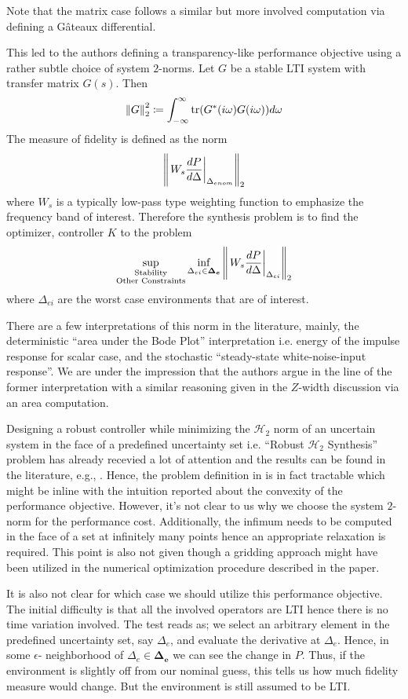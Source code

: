 Note that the matrix case follows a similar but more involved computation via defining a G\^{a}teaux differential.


This led to the authors defining a transparency-like performance objective using a rather subtle choice of system 
$2$-norms. Let $G$ be a stable LTI system with transfer matrix $G(s)$. Then 
\[
\displaystyle \left\| G \right\|_2^2 \coloneqq \int_{-\infty}^\infty{\operatorname{tr}(G^*(i\omega)G(i\omega))}d\omega
\] 
The measure of fidelity is defined as the norm
\[
\displaystyle \left\| \left.W_s\frac{dP}{d\Delta}\right|_{\Delta_{enom}} \right\|_2
\]
where $W_s$ is a typically low-pass type weighting function to emphasize the frequency band of interest. Therefore
the synthesis problem is to find the optimizer, controller $K$ to the problem
\[
\sup_{\substack{\text{Stability}\\\text{Other Constraints}}}\inf_{\Delta_{ei}\in\bm{\Delta_e}}
\displaystyle \left\| \left.W_s\frac{dP}{d\Delta}\right|_{\Delta_{ei}} \right\|_2
\]
where $\Delta_{ei}$ are the worst case environments that are of interest.


There are a few interpretations of this norm in the literature, mainly, the deterministic \enquote{area under the Bode
Plot} interpretation i.e. energy of the impulse response for scalar case, and the stochastic \enquote{steady-state 
white-noise-input response}. We are under the impression that the authors argue in the line of the former interpretation
with a similar reasoning given in the $Z$-width discussion via an area computation. 


Designing a robust controller while minimizing the $\mathcal{H}_2$ norm of an uncertain system in the face of a predefined 
uncertainty set i.e. \enquote{Robust $\mathcal{H}_2$ Synthesis} problem has already recevied a lot of attention and 
the results can be found in the literature, e.g., \cite{dullerud}. Hence, the problem definition in \cite{cavusoglu} is 
in fact tractable which might be inline with the intuition reported about the convexity of the performance objective. However, 
it's not clear to us why we choose the system $2$-norm for the performance cost. Additionally, the infimum needs to be 
computed in the face of a set at infinitely many points hence an appropriate relaxation is required. This point is also not 
given though a gridding approach might have been utilized in the numerical optimization procedure described in the paper.

It is also not clear for which case we should utilize this performance objective. The initial difficulty is that all the 
involved operators are LTI hence there is no time variation involved. The test reads as; we select an arbitrary element 
in the predefined uncertainty set, say $\Delta_e$, and evaluate the derivative at $\Delta_e$. Hence, in some $\epsilon$-
neighborhood of $\Delta_e\in\bm{\Delta_e}$ we can see the change in $P$. Thus, if the environment is slightly off from our 
nominal guess, this tells us how much fidelity measure would change. But the environment is still assumed to be LTI.


